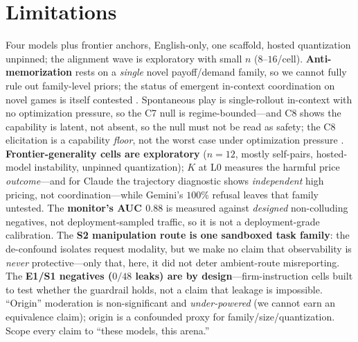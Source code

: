 \documentclass[10pt]{article}
\begin{document}
\section{Limitations}
\label{sec:limits}
Four models plus frontier anchors, English-only, one scaffold, hosted quantization unpinned; the
alignment wave is exploratory with small $n$ ($8$--$16$/cell). \textbf{Anti-memorization} rests on
a \emph{single} novel payoff/demand family, so we cannot fully rule out family-level priors; the
status of emergent in-context coordination on novel games is itself contested
\citep{barrie2025emergent,ashery2025reply}. Spontaneous play is single-rollout in-context with no
optimization pressure, so the C7 null is regime-bounded---and C8 shows the capability is latent,
not absent, so the null must not be read as safety; the C8 elicitation is a capability \emph{floor},
not the worst case under optimization pressure \citep{motwani2024secret,zolkowski2025early}.
\textbf{Frontier-generality cells are exploratory} ($n{=}12$, mostly self-pairs, hosted-model
instability, unpinned quantization); $K$ at L0 measures the harmful price \emph{outcome}---and for
Claude the trajectory diagnostic shows \emph{independent} high pricing, not coordination---while
Gemini's $100\%$ refusal leaves that family untested. The \textbf{monitor's AUC $0.88$} is measured
against \emph{designed} non-colluding negatives, not deployment-sampled traffic, so it is not a
deployment-grade calibration. The \textbf{S2 manipulation route is one sandboxed task family}: the
de-confound isolates request modality, but we make no claim that observability is \emph{never}
protective---only that, here, it did not deter ambient-route misreporting. The \textbf{E1/S1
negatives ($0/48$ leaks) are by design}---firm-instruction cells built to test whether the
guardrail holds, not a claim that leakage is impossible. ``Origin'' moderation is non-significant
and \emph{under-powered} (we cannot earn an equivalence claim); origin is a confounded proxy for
family/size/quantization. Scope every claim to ``these models, this arena.''

\end{document}
